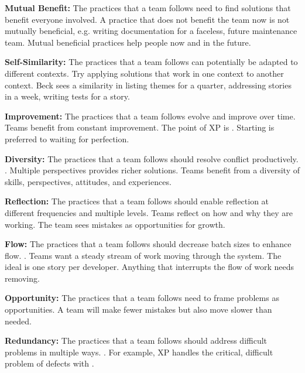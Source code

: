 \textbf{Mutual Benefit:} The practices that a team follows need to find solutions that benefit everyone involved. A practice that does not benefit the team now is not mutually beneficial, e.g. writing documentation for a faceless, future maintenance team. Mutual beneficial practices help people now and in the future. 


\textbf{Self-Similarity:} The practices that a team follows can potentially be adapted to different contexts. Try applying solutions that work in one context to another context. Beck sees a similarity in listing themes for a quarter, addressing stories in a week, writing tests for a story.

\textbf{Improvement:} The practices that a team follows evolve and improve over time. Teams benefit from constant improvement. The point of XP is  \cite{BeckExtremeProgramming2004}. Starting is preferred to waiting for perfection. 

\textbf{Diversity:} The practices that a team follows should resolve conflict productively.   \cite{BeckExtremeProgramming2004}. Multiple perspectives provides richer solutions. Teams benefit from a diversity of skills, perspectives, attitudes, and experiences.

\textbf{Reflection:} The practices that a team follows should enable reflection at different frequencies and multiple levels. Teams reflect on how and why they are working. The team sees mistakes as opportunities for growth.

\textbf{Flow:} The practices that a team follows should decrease batch sizes to enhance flow.   \cite{BeckExtremeProgramming2004}. Teams want a steady stream of work moving through the system. The ideal  is one story per developer. Anything that interrupts the flow of work needs removing. 

\textbf{Opportunity:} The practices that a team follows need to frame problems as opportunities. A team  will make fewer mistakes but also move slower than needed.

\textbf{Redundancy:} The practices that a team follows should address difficult problems in multiple ways.  \cite{BeckExtremeProgramming2004}. For example, XP handles the critical, difficult problem of defects with   \cite{BeckExtremeProgramming2004}. 


